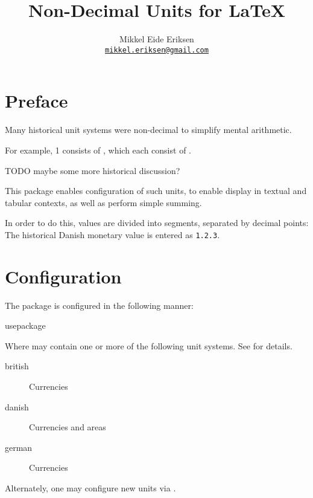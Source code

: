 \documentclass{article}
\title{Non-Decimal Units for \LaTeX}
\author{Mikkel Eide Eriksen\\\href{mailto:mikkel.eriksen@gmail.com}{\texttt{mikkel.eriksen@gmail.com}}}
\begin{document}
\maketitle

\section{Preface} %

Many historical unit systems were non-decimal to simplify mental arithmetic.

For example, 1  consists of  , which each consist of  .

TODO maybe some more historical discussion?

This package enables configuration of such units, to enable display in textual and tabular contexts, as well as perform simple summing.

In order to do this, values are divided into segments, separated by decimal points: The historical Danish monetary value  is entered as \texttt{1.2.3}.

\section{Configuration} %

The package is configured in the following manner:

\begin{docCommand}
	{usepackage}
	{}

Where  may contain one or more of the following unit systems. See  for details.

\begin{description}
\item[british] Currencies
\item[danish] Currencies and areas
\item[german] Currencies
\end{description}

Alternately, one may configure new units via .

\end{docCommand}
\end{document}
